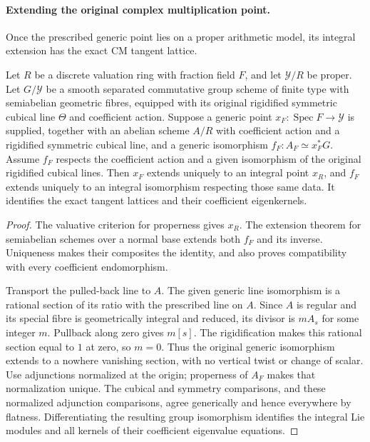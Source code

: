 \paragraph{Extending the original complex multiplication point.}
Once the prescribed generic point lies on a proper arithmetic model,
its integral extension has the exact CM tangent lattice.

\begin{proposition}\label{geo-cm-integral-map-extension}
Let $R$ be a discrete valuation ring with fraction field $F$, and let
$\mathcal Y/R$ be proper. Let $G/\mathcal Y$ be a smooth separated
commutative group scheme of finite type with semiabelian geometric fibres,
equipped with its original rigidified symmetric cubical line $\Theta$ and coefficient
action. Suppose a generic point $x_F:\operatorname{Spec}F\to\mathcal Y$
is supplied, together with an abelian scheme $A/R$ with coefficient action
and a rigidified symmetric cubical line, and a generic
isomorphism $f_F:A_F\simeq x_F^*G$. Assume $f_F$ respects the coefficient
action and a given isomorphism of the original rigidified cubical lines.
Then $x_F$ extends uniquely to an integral point $x_R$, and $f_F$
extends uniquely to an integral isomorphism respecting those same data.
It identifies the exact tangent lattices and their coefficient
eigenkernels.
\end{proposition}
\begin{proof}
The valuative criterion for properness gives $x_R$.
The extension theorem for semiabelian schemes over a normal base
\cite[\S2, Lemma~1]{faltings-semiabelian-extension}
extends both $f_F$ and its inverse. Uniqueness makes their composites
the identity, and also proves compatibility with every coefficient
endomorphism.

Transport the pulled-back line to $A$. The given generic line
isomorphism is a rational section of its ratio with the prescribed line
on $A$. Since $A$ is regular and its special fibre is geometrically
integral and reduced, its divisor is $mA_s$ for some integer $m$.
Pullback along zero gives $m[s]$. The rigidification makes this
rational section equal to $1$ at zero, so $m=0$. Thus the original
generic isomorphism extends to a nowhere vanishing section, with no
vertical twist or change of scalar. Use adjunctions normalized at the
origin; properness of $A_F$ makes that normalization unique.
The cubical and symmetry comparisons, and these normalized adjunction
comparisons, agree generically and hence everywhere by flatness.
Differentiating the resulting group isomorphism identifies the integral
Lie modules and all kernels of their coefficient eigenvalue equations.
\end{proof}

